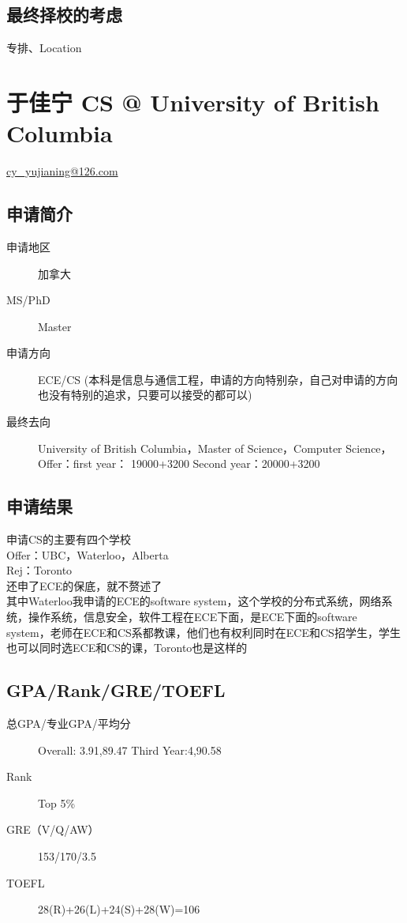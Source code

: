 \documentclass[11pt,fleqn,openany]{book} %
\begin{document}
\subsection*{最终择校的考虑}
专排、Location
\clearpage
\section{于佳宁 CS @ University of British Columbia}
\hfill \href{mailto:cy_yujianing@126.com}{cy\_yujianing@126.com}

\noindent\begin{minipage}[t]{0.45\textwidth}
\subsection*{申请简介}
\begin{description}
\item[申请地区] 加拿大
\item[MS/PhD] Master
\item[申请方向] ECE/CS (本科是信息与通信工程，申请的方向特别杂，自己对申请的方向也没有特别的追求，只要可以接受的都可以)
\item[最终去向] University of British Columbia，Master of Science，Computer Science，
Offer：first year： 19000+3200
       Second year：20000+3200
\end{description}
\end{minipage}
\hfill
\begin{minipage}[t]{0.45\textwidth}
\subsection*{申请结果}
\noindent 申请CS的主要有四个学校\\
Offer：UBC，Waterloo，Alberta\\
Rej：Toronto\\
还申了ECE的保底，就不赘述了\\
其中Waterloo我申请的ECE的software system，这个学校的分布式系统，网络系统，操作系统，信息安全，软件工程在ECE下面，是ECE下面的software system，老师在ECE和CS系都教课，他们也有权利同时在ECE和CS招学生，学生也可以同时选ECE和CS的课，Toronto也是这样的
\end{minipage}
\subsection*{GPA/Rank/GRE/TOEFL}
\begin{description}
\item[总GPA/专业GPA/平均分] Overall: 3.91,89.47 Third Year:4,90.58
\item[Rank] Top 5\%
\item[GRE（V/Q/AW）] 153/170/3.5
\item[TOEFL] 28(R)+26(L)+24(S)+28(W)=106
\end{description}
\end{document}
